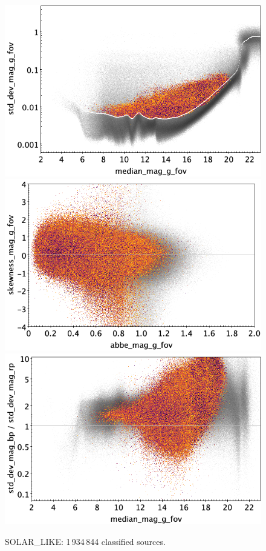 \documentclass[longauth]{aa}
\begin{document}
\begin{appendix}
\begin{figure}
\hspace{2mm}
 \includegraphics[width=0.45\hsize]{figures/appendix/SOLAR_cls_msd.png} \\ %
\vspace{4mm}
 \includegraphics[width=0.45\hsize]{figures/appendix/SOLAR_cls_ask.png}  %
\hspace{2mm}
 \includegraphics[width=0.45\hsize]{figures/appendix/SOLAR_cls_msdr.png}  \\ %
\vspace{4mm}
 \caption{SOLAR\_LIKE: 1\,934\,844 classified sources.}  
 \label{fig:app:SOLAR}
\end{figure}


\end{appendix}
\end{document}
